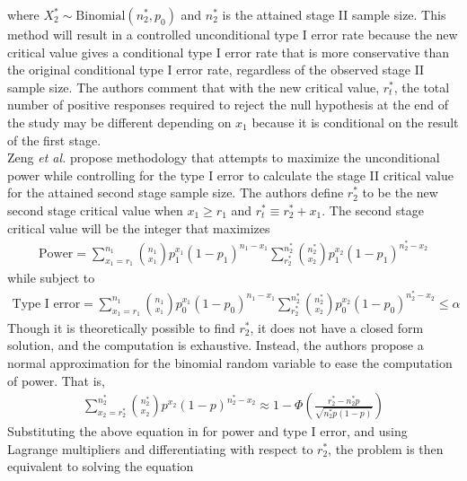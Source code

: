 \documentclass[12pt]{report}\usepackage[]{graphicx}\usepackage[]{color}
\newlength{\li}\setlength{\li}{14.48pt}
\newlength{\di}\setlength{\di}{-3.5mm}
\begin{document}
where $X_2^\ast \sim \mbox{Binomial}(n_2^\ast, p_0)$ and $n_2^\ast$ is the attained stage II sample size. This method will result in a controlled unconditional type I error rate because the new critical value gives a conditional type I error rate that is more conservative than the original conditional type I error rate, regardless of the observed stage II sample size. The authors comment that with the new critical value, $r_t^\ast$, the total number of positive responses required to reject the null hypothesis at the end of the study may be different depending on $x_1$ because it is conditional on the result of the first stage. \\
\indent Zeng \textit{et al.} \cite{Zeng} propose methodology that attempts to maximize the unconditional power while controlling for the type I error to calculate the stage II critical value for the attained second stage sample size. The authors define $r_2^\ast$ to be the new second stage critical value when $x_1 \geq r_1$ and $r_t^\ast \equiv r_2^\ast + x_1$. The second stage critical value will be the integer that maximizes 
\begin{equation}
\begin{aligned}
\mbox{Power} = \sum_{x_1 = r_1}^{n_1} {n_1 \choose x_1} p_1^{x_1} (1-p_1)^{n_1 - x_1} \sum_{r_2^\ast}^{n_2^\ast} {n_2^\ast \choose x_2} p_1^{x_2} (1-p_1)^{{n_2^\ast}-x_2}
\end{aligned}
\end{equation}
while subject to 
\begin{equation}
\begin{aligned}
 \mbox{Type I error} = \sum_{x_1 = r_1}^{n_1} {n_1 \choose x_1} p_0^{x_1} (1-p_0)^{n_1 - x_1} \sum_{r_2^\ast}^{n_2^\ast} {n_2^\ast \choose x_2} p_0^{x_2}(1-p_0)^{{n_2^\ast}-x_2} \leq \alpha
\end{aligned}
\end{equation}
Though it is theoretically possible to find $r_2^\ast$, it does not have a closed form solution, and the computation is exhaustive. Instead, the authors propose a normal approximation for the binomial random variable to ease the computation of power. That is, 
\begin{equation}
\begin{aligned}
\sum_{x_2 = r_2^\ast}^{n_2^\ast} {n_2^\ast \choose x_2} p^{x_2} (1-p)^{n_2^\ast - x_2} \approx 1-\Phi \left(\frac{r_2^\ast - n_2^\ast p}{\sqrt{n_2^\ast p(1-p)}} \right)
\end{aligned}
\end{equation}
Substituting the above equation in for power and type I error, and using Lagrange multipliers and differentiating with respect to $r_2^\ast$, the problem is then equivalent to solving the equation 
\end{document}
